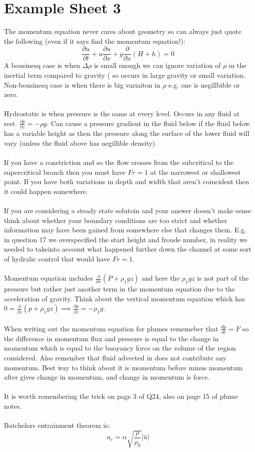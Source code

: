 \documentclass{article}
\begin{document}
\section{Example Sheet 3}
The momentum equation never cares about geometry so can always just quote the following (even if it says find the momentum equation!):
$$
\frac{\partial u}{\partial t} + u \frac{\partial u}{\partial x} + g \frac{\partial }{\partial x}( H +h) = 0
$$
A bousinesq case is when $\Delta \rho$ is small enough we can ignore variation of $\rho$ in the inertial term compared to gravity ( so occurs in large gravity or small variation. Non-bousinesq case is when there is big variaiton in $\rho$ e.g. one is negillbible or zero. \\\\
Hydrostatic is when pressure is the same at every level. Occurs in any fluid at rest. $\frac{\partial p}{\partial z} = - \rho g$. Can cause a pressure gradient in the fluid below if the fluid below has a variable height as then the pressure along the surface of the lower fluid will vary (unless the fluid above has negillible density).\\\\
If you have a constriction and so the flow crosses from the subcritical to the supercritical branch then you must have $Fr =1$ at the narrowest or shallowest point. If you have both variations in depth and width that aren't coincident then it could happen somewhere.\\\\
If you are considering a steady state solutoin and your answer doesn't make sense think about whether your boundary conditions are too strict and whether information may have been gained from somewhere else that changes them. E.g. in question 17 we overspecified the start height and froude number, in reality we needed to takeinto account what happened further down the channel at some sort of hydralic control that would have $Fr =1$.\\\\
Momentum equation includes $\frac{\partial}{\partial x}( P + \rho_1 g z)$ and here the $\rho_1 g z$ is not part of the pressure but rather just another term in the momentum equation due to the acceleration of gravity. Think about the vertical momentum equation which has $0 = \frac{\partial}{\partial z} ( p + \rho_1 g z) \implies \frac{\partial p}{\partial z} = - \rho_1 g$.\\\\
When writing out the momentum equation for plumes rememeber that $\frac{d p}{dt} = F$ so the difference in momentum flux and pressure is equal to the change in momentum which is equal to the buoyancy force on the volume of the region considered. Also remember that fluid advected in does not contribute any momentum. Best way to think about it is momentum before minus momentum after gives change in momentum, and change in momentum is force.\\\\
It is worth remembering the trick on page 3 of Q24, also on page 15 of plume notes.\\\\
Batchelors entrainment theorem is:
$$
 u_e = \alpha \sqrt{\frac{\rho}{\rho_0}} |\bar u|
$$
\end{document}
